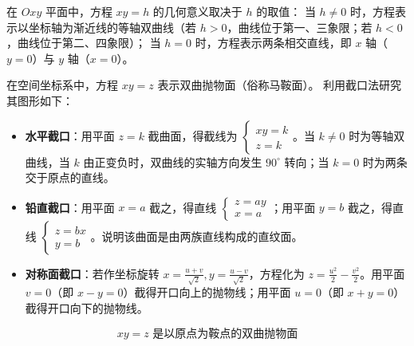\begin{solution}

    在 $Oxy$ 平面中，方程 $xy = h$ 的几何意义取决于 $h$ 的取值：
    当 $h \neq 0$ 时，方程表示以坐标轴为渐近线的等轴双曲线（若 $h > 0$，曲线位于第一、三象限；若 $h < 0$，曲线位于第二、四象限）；
    当 $h = 0$ 时，方程表示两条相交直线，即 $x$ 轴（$y = 0$）与 $y$ 轴（$x = 0$）。


    在空间坐标系中，方程 $xy = z$ 表示双曲抛物面（俗称马鞍面）。
    利用截口法研究其图形如下：
    \begin{itemize}
        \item \textbf{水平截口}：用平面 $z = k$ 截曲面，得截线为 $\begin{cases} xy = k \\ z = k \end{cases}$。当 $k \neq 0$ 时为等轴双曲线，当 $k$ 由正变负时，双曲线的实轴方向发生 $90^\circ$ 转向；当 $k = 0$ 时为两条交于原点的直线。
        \item \textbf{铅直截口}：用平面 $x = a$ 截之，得直线 $\begin{cases} z = ay \\ x = a \end{cases}$；用平面 $y = b$ 截之，得直线 $\begin{cases} z = bx \\ y = b \end{cases}$。说明该曲面是由两族直线构成的直纹面。
        \item \textbf{对称面截口}：若作坐标旋转 $x = \frac{u+v}{\sqrt{2}}, y = \frac{u-v}{\sqrt{2}}$，方程化为 $z = \frac{u^2}{2} - \frac{v^2}{2}$。用平面 $v = 0$（即 $x-y=0$）截得开口向上的抛物线；用平面 $u = 0$（即 $x+y=0$）截得开口向下的抛物线。
    \end{itemize}
    \begin{equation}
        \boxed{xy = z \text{ 是以原点为鞍点的双曲抛物面}}
    \end{equation}
\end{solution}

\endinput
